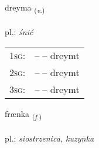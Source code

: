 \documentclass[frontgrid, backgrid]{flacards}\usepackage[]{graphicx}\usepackage[]{xcolor}
\begin{document}
\renewcommand{\flhead}{\vskip5pt \fboxsep=0pt {\small\bfseries\footnotesize Sagnorð | Verb}}
\renewcommand{\fcfoot}{\vskip5pt \fboxsep=0pt \hspace{2pt}{\small\bfseries\footnotesize 2K}}

\renewcommand{\blhead}{\vskip5pt {\small\bfseries\footnotesize Sagnorð | Verb }}
\renewcommand{\bcfoot}{\vskip5pt \hspace{2pt}{\small\bfseries\footnotesize 2K}}


{dreyma \small{\textsubscript{(\textit{v.})}} \\[1ex] %
\textphonetic{[treiːma]} \\
pl.: \emph{śnić} \\  [2ex]
\renewcommand*{\arraystretch}{0.8}
\begin{tabular}{p{1cm}l}
\textsc{1sg}: &  --  -- dreymt \\ 
\textsc{2sg}: &  --  -- dreymt \\ 
\textsc{3sg}: &  --  -- dreymt \\ 
\end{tabular}
}

\renewcommand{\flhead}{\vskip5pt \fboxsep=0pt {\small\bfseries\footnotesize Nafnorð | Noun}}
\renewcommand{\fcfoot}{\vskip5pt \fboxsep=0pt \hspace{2pt}{\small\bfseries\footnotesize 2K}}

\renewcommand{\blhead}{\vskip5pt {\small\bfseries\footnotesize Nafnorð | Noun }}
\renewcommand{\bcfoot}{\vskip5pt \hspace{2pt}{\small\bfseries\footnotesize 2K}}


{frænka \small{\textsubscript{(\textit{f.})}} \\[1ex] %
\textphonetic{[fraiŋ̥ka]} \\
pl.: \emph{siostrzenica, kuzynka} \\  [2ex]
\renewcommand*{\arraystretch}{0.8}
}
\end{document}
